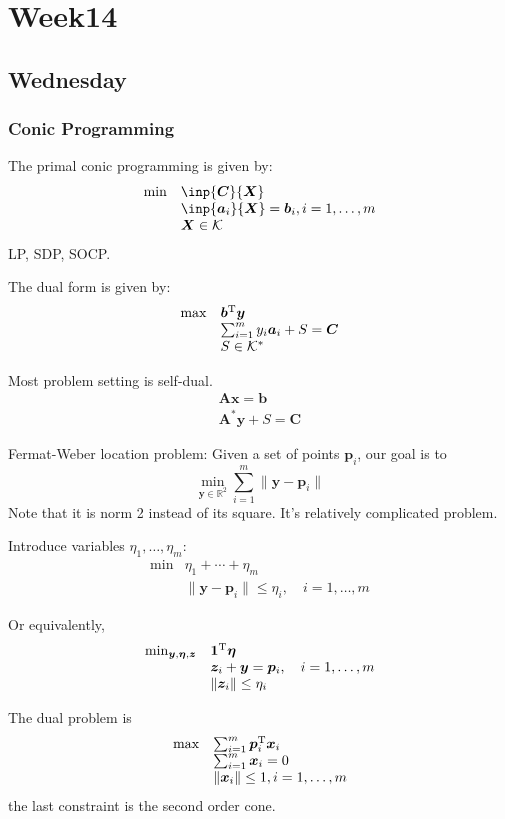 \chapter{Week14}
\section{Wednesday}
\subsection{Conic Programming}
The primal conic programming is given by:
\[
\begin{array}{ll}
\min&\inp{\bm C}{\bm X}\\
&\inp{\bm a_i}{\bm X}=\bm b_i,i=1,\dots,m\\
&\bm X\in\mathcal{K}
\end{array}
\]
LP, SDP, SOCP.

The dual form is given by:
\[
\begin{array}{ll}
\max&\bm b^{\mathrm T}\bm y\\
&\sum_{i=1}^my_i\bm a_i+S=\bm C\\
&S\in\mathcal{K}^*
\end{array}
\]

Most problem setting is self-dual.
\[
\begin{array}{l}
\bm{Ax}=\bm b\\
\bm A^*\bm y+S=\bm C
\end{array}
\]

Fermat-Weber location problem: Given a set of points $\bm p_i$, our goal is to
\[
\min_{\bm y\in\mathbb{R}^2}\sum_{i=1}^m\|\bm y-\bm p_i\|
\]
Note that it is norm 2 instead of its square. It's relatively complicated problem.

Introduce variables $\eta_1,\dots,\eta_m$:
\[
\begin{array}{ll}
\min&\eta_1+\cdots+\eta_m\\
&\|\bm y-\bm p_i\|\le\eta_i,\quad i=1,\dots,m
\end{array}
\]

Or equivalently,
\[
\begin{array}{ll}
\min_{\bm y,\bm\eta,\bm z}&\bm 1^{\mathrm T}\bm\eta\\
&\bm z_i+\bm y=\bm p_i,\quad i=1,\dots,m\\
&\|\bm z_i\|\le\eta_i
\end{array}
\]

The dual problem is
\[
\begin{array}{ll}
\max&\sum_{i=1}^m\bm p_i^{\mathrm T}\bm x_i\\
&\sum_{i=1}^m\bm x_i=0\\
&\|\bm x_i\|\le1,i=1,\dots,m
\end{array}
\]
the last constraint is the second order cone.

